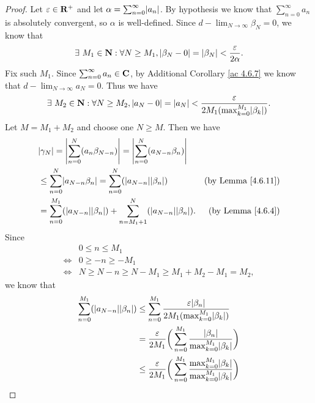 \begin{proof}
    Let \(\varepsilon \in \mathbf{R}^+\) and let \(\alpha = \sum_{n = 0}^\infty \abs{a_n}\).
    By hypothesis we know that \(\sum_{n = 0}^\infty a_n\) is absolutely convergent, so \(\alpha\) is well-defined.
    Since \(d - \lim_{N \to \infty} \beta_N = 0\), we know that
    \[
        \exists\ M_1 \in \mathbf{N} : \forall N \geq M_1, \left\lvert\beta_N - 0\right\rvert = \left\lvert\beta_N\right\rvert < \frac{\varepsilon}{2 \alpha}.
    \]
    Fix such \(M_1\).
    Since \(\sum_{n = 0}^\infty a_n \in \mathbf{C}\), by Additional Corollary \ref{ac 4.6.7} we know that \(d - \lim_{N \to \infty} a_N = 0\).
    Thus we have
    \[
        \exists\ M_2 \in \N : \forall N \geq M_2, \abs{a_N - 0} = \abs{a_N} < \frac{\varepsilon}{2 M_1 (\max_{k = 0}^{M_1} \abs{\beta_k})}.
    \]
    Let \(M = M_1 + M_2\) and choose one \(N \geq M\).
    Then we have
    \begin{align*}
         & \abs{\gamma_N} = \abs{\sum_{n = 0}^N (a_n \beta_{N - n})} = \abs{\sum_{n = 0}^N (a_{N - n} \beta_n)}                                          \\
         & \leq \sum_{n = 0}^N \abs{a_{N - n} \beta_n} = \sum_{n = 0}^N (\abs{a_{N - n}} \abs{\beta_n})                 & \text{(by Lemma \ref{4.6.11})} \\
         & = \sum_{n = 0}^{M_1} (\abs{a_{N - n}} \abs{\beta_n}) + \sum_{n = M_1 + 1}^N (\abs{a_{N - n}} \abs{\beta_n}). & \text{(by Lemma \ref{4.6.4})}
    \end{align*}
    Since
    \begin{align*}
             & 0 \leq n \leq M_1                                     \\
        \iff & 0 \geq -n \geq -M_1                                   \\
        \iff & N \geq N - n \geq N - M_1 \geq M_1 + M_2 - M_1 = M_2,
    \end{align*}
    we know that
    \begin{align*}
        \sum_{n = 0}^{M_1} (\abs{a_{N - n}} \abs{\beta_n}) & \leq \sum_{n = 0}^{M_1} \frac{\varepsilon \abs{\beta_n}}{2 M_1 (\max_{k = 0}^{M_1} \abs{\beta_k})}                                      \\
                                                           & = \frac{\varepsilon}{2 M_1} \bigg(\sum_{n = 0}^{M_1} \frac{\abs{\beta_n}}{\max_{k = 0}^{M_1} \abs{\beta_k}}\bigg)                       \\
                                                           & \leq \frac{\varepsilon}{2 M_1} \bigg(\sum_{n = 0}^{M_1} \frac{\max_{k = 0}^{M_1} \abs{\beta_k}}{\max_{k = 0}^{M_1} \abs{\beta_k}}\bigg) \\

\end{align*}
\end{proof}
